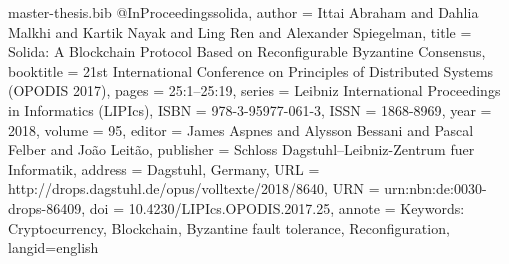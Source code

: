 \begin{filecontents}{master-thesis.bib}
@InProceedings{solida,
  author =	{Ittai Abraham and Dahlia Malkhi and Kartik Nayak and Ling Ren and Alexander Spiegelman},
  title =	{{Solida: A Blockchain Protocol Based on Reconfigurable Byzantine Consensus}},
  booktitle =	{21st International Conference on Principles of Distributed Systems (OPODIS 2017)},
  pages =	{25:1--25:19},
  series =	{Leibniz International Proceedings in Informatics (LIPIcs)},
  ISBN =	{978-3-95977-061-3},
  ISSN =	{1868-8969},
  year =	{2018},
  volume =	{95},
  editor =	{James Aspnes and Alysson Bessani and Pascal Felber and Jo{\~a}o Leit{\~a}o},
  publisher =	{Schloss Dagstuhl--Leibniz-Zentrum fuer Informatik},
  address =	{Dagstuhl, Germany},
  URL =		{http://drops.dagstuhl.de/opus/volltexte/2018/8640},
  URN =		{urn:nbn:de:0030-drops-86409},
  doi =		{10.4230/LIPIcs.OPODIS.2017.25},
  annote =	{Keywords: Cryptocurrency, Blockchain, Byzantine fault tolerance, Reconfiguration},
  langid={english}
}

\end{filecontents}